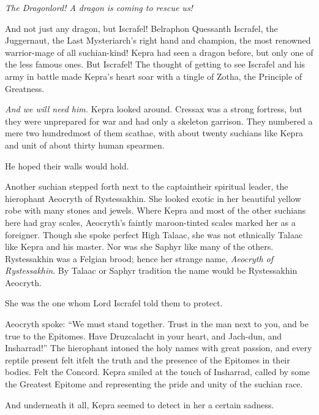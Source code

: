 \documentclass
  [a4paper,
   12pt,
   oneside
  ]%
  {article}
\begin{document}
\emph{The Dragonlord! A dragon is coming to rescue us!} 

And not just any dragon, but Iscrafel! Belraphon Quessanth Iscrafel, the Juggernaut, the Last Mysteriarch's right hand and champion, the most renowned warrior-mage of all suchian-kind! Kepra had seen a dragon before, but only one of the less famous ones.
But Iscrafel! The thought of getting to see Iscrafel and his army in battle made Kepra's heart soar with a tingle of Zotha, the Principle of Greatness.

\emph{And we will need him.} 
Kepra looked around. 
Cressax was a strong fortress, but they were unprepared for war and had only a skeleton garrison.
They numbered a mere two hundred\dash{}most of them scathae, with about twenty suchians like Kepra and unit of about thirty human spearmen.

He hoped their walls would hold. 


Another suchian stepped forth next to the captain\dash{}their spiritual leader, the hierophant Aeocryth of Rystessakhin.
She looked exotic in her beautiful yellow robe with many stones and jewels. 
Where Kepra and most of the other suchians here had gray scales, Aeocryth’s faintly maroon-tinted scales marked her as a foreigner. 
Though she spoke perfect High Talaac, she was not ethnically Talaac like Kepra and his master. Nor was she Saphyr like many of the others. 
Rystessakhin was a Felgian brood; hence her strange name, \emph{Aeocryth of Rystessakhin}. 
By Talaac or Saphyr tradition the name would be Rystessakhin Aeocryth. 

She was the one whom Lord Iscrafel told them to protect.

Aeocryth spoke: ``We must stand together. Trust in the man next to you, and be true to the Epitomes. Have Druzcalacht in your heart, and Jach-dun, and Insharrad!'' 
The hierophant intoned the holy names with great passion, and every reptile present felt it\dash{}felt the truth and the presence of the Epitomes in their bodies. Felt the Concord. 
Kepra smiled at the touch of Insharrad, called by some the Greatest Epitome and representing the pride and unity of the suchian race.

And underneath it all, Kepra seemed to detect in her a certain sadness.
\end{document}
